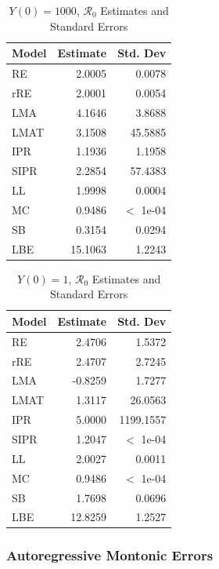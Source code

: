 \documentclass[12pt]{article}
\newcommand{\rr}{\ensuremath{\mathcal{R}_0}}
\begin{document}
\begin{table}[H]
	
	\centering
	\begin{tabular}[t]{l|r|r}
		\hline
		Model & Estimate & Std. Dev\\
		\hline
		RE & 2.0005 & 0.0078\\
		\hline
		rRE & 2.0001 & 0.0054\\
		\hline
		LMA & 4.1646 & 3.8688\\
		\hline
		LMAT & 3.1508 & 45.5885\\
		\hline
		IPR & 1.1936 & 1.1958\\
		\hline
		SIPR & 2.2854 & 57.4383\\
		\hline
		LL & 1.9998 & 0.0004\\
		\hline
		MC & 0.9486 & $<$ 1e-04\\
		\hline
		SB & 0.3154 & 0.0294\\
		\hline
		LBE & 15.1063 & 1.2243\\
		\hline
	\end{tabular}
	\caption{$Y(0) = 1000$, $\rr$ Estimates and Standard Errors}
\end{table}

\begin{table}[H]
	
	\centering
	\begin{tabular}[t]{l|r|r}
		\hline
		Model & Estimate & Std. Dev\\
		\hline
		RE & 2.4706 & 1.5372\\
		\hline
		rRE & 2.4707 & 2.7245\\
		\hline
		LMA & -0.8259 & 1.7277\\
		\hline
		LMAT & 1.3117 & 26.0563\\
		\hline
		IPR & 5.0000 & 1199.1557\\
		\hline
		SIPR & 1.2047 & $<$ 1e-04\\
		\hline
		LL & 2.0027 & 0.0011\\
		\hline
		MC & 0.9486 & $<$ 1e-04\\
		\hline
		SB & 1.7698 & 0.0696\\
		\hline
		LBE & 12.8259 & 1.2527\\
		\hline
	\end{tabular}
	\caption{$Y(0) = 1$, $\rr$ Estimates and Standard Errors}
\end{table}

\subsubsection{Autoregressive Montonic Errors}
\end{document}
